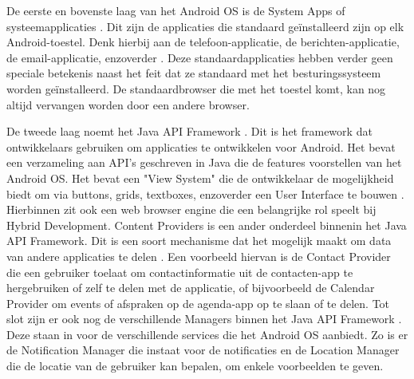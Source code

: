 De eerste en bovenste laag van het Android OS is de System Apps of systeemapplicaties \autocite{Bron7, Bron13}. Dit zijn de applicaties die standaard geïnstalleerd zijn op elk Android-toestel. Denk hierbij aan de telefoon-applicatie, de berichten-applicatie, de email-applicatie, enzoverder \autocite{Bron7}. Deze standaardapplicaties hebben verder geen speciale betekenis naast het feit dat ze standaard met het besturingssysteem worden geïnstalleerd. De standaardbrowser die met het toestel komt, kan nog altijd vervangen worden door een andere browser.

De tweede laag noemt het Java API Framework \autocite{Bron7}. Dit is het framework dat ontwikkelaars gebruiken om applicaties te ontwikkelen voor Android. Het bevat een verzameling aan API's geschreven in Java die de features voorstellen van het Android OS. Het bevat een "View System" die de ontwikkelaar de mogelijkheid biedt om via buttons, grids, textboxes, enzoverder een User Interface te bouwen \autocite{Bron7, Bron13}. Hierbinnen zit ook een web browser engine die een belangrijke rol speelt bij Hybrid Development. Content Providers is een ander onderdeel binnenin het Java API Framework. Dit is een soort mechanisme dat het mogelijk maakt om data van andere applicaties te delen \autocite{Bron7}. Een voorbeeld hiervan is de Contact Provider die een gebruiker toelaat om contactinformatie uit de contacten-app te hergebruiken of zelf te delen met de applicatie, of bijvoorbeeld de Calendar Provider om events of afspraken op de agenda-app op te slaan of te delen. Tot slot zijn er ook nog de verschillende Managers binnen het Java API Framework \autocite{Bron7}. Deze staan in voor de verschillende services die het Android OS aanbiedt. Zo is er de Notification Manager die instaat voor de notificaties en de Location Manager die de locatie van de gebruiker kan bepalen, om enkele voorbeelden te geven.

